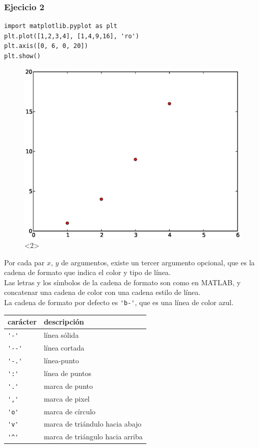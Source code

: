 \begin{frame}[fragile]
\frametitle{Ejecicio 2}
\begin{lstlisting}
import matplotlib.pyplot as plt
plt.plot([1,2,3,4], [1,4,9,16], 'ro')
plt.axis([0, 6, 0, 20])
plt.show()
\end{lstlisting}
\begin{figure}
	\centering
	\includegraphics[scale=0.35]{plotEjercicio2.eps}<2> 
\end{figure}
\end{frame}
\begin{frame}[fragile]
Por cada par $x$, $y$ de argumentos, existe un tercer argumento opcional, que es la cadena de formato que indica el color y tipo de línea.
\\
\medskip
Las letras y los símbolos de la cadena de formato son como en MATLAB, y concatenar una cadena de color con una cadena estilo de línea.
\\
\medskip
La cadena de formato por defecto es \verb|'b-'|, que es una línea de color azul.
\end{frame}
\begin{frame}[fragile]
\begin{tabular}{l | l}
carácter & descripción \\ \hline
\verb|'-'|	& línea sólida \\ \hline
\verb|'--'| & línea cortada \\ \hline
\verb|'-.'| & línea-punto \\ \hline
\verb|':'|	& línea de puntos \\ \hline
\verb|'.'|	& marca de punto \\ \hline
\verb|','|	& marca de pixel \\ \hline
\verb|'o'|	& marca de círculo \\ \hline
\verb|'v'|	& marca de triándulo hacia abajo \\ \hline
\verb|'^'|	& marca de triángulo hacia arriba
\end{tabular}
\end{frame}
